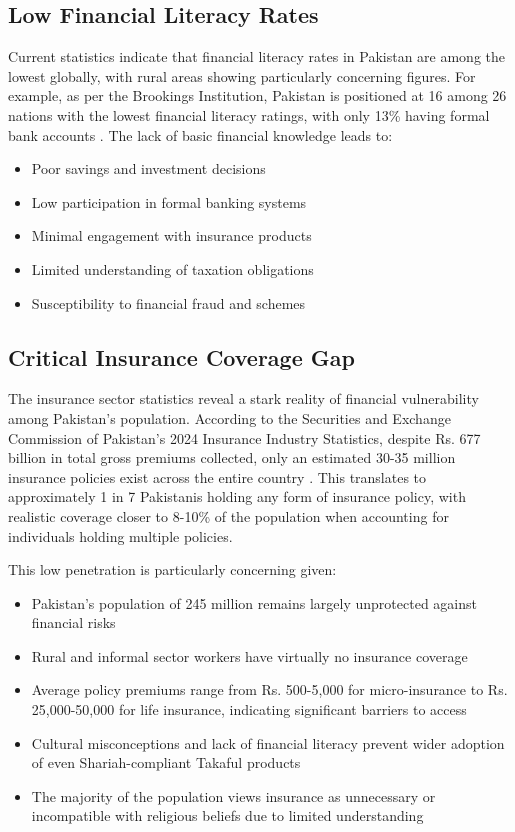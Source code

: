 \documentclass[12pt]{article}
\begin{document}
\subsection{Low Financial Literacy Rates}
Current statistics indicate that financial literacy rates in Pakistan are among the lowest globally, with rural areas showing particularly concerning figures. For example, as per the Brookings Institution, Pakistan is positioned at 16 among 26 nations with the lowest financial literacy ratings, with only 13\% having formal bank accounts \cite{brookings2024}. The lack of basic financial knowledge leads to:
\begin{itemize}
    \item Poor savings and investment decisions
    \item Low participation in formal banking systems
    \item Minimal engagement with insurance products
    \item Limited understanding of taxation obligations
    \item Susceptibility to financial fraud and schemes
\end{itemize}

\subsection{Critical Insurance Coverage Gap}
The insurance sector statistics reveal a stark reality of financial vulnerability among Pakistan's population. According to the Securities and Exchange Commission of Pakistan's 2024 Insurance Industry Statistics, despite Rs. 677 billion in total gross premiums collected, only an estimated 30-35 million insurance policies exist across the entire country \cite{secp2024}. This translates to approximately 1 in 7 Pakistanis holding any form of insurance policy, with realistic coverage closer to 8-10\% of the population when accounting for individuals holding multiple policies.

This low penetration is particularly concerning given:
\begin{itemize}
    \item Pakistan's population of 245 million remains largely unprotected against financial risks
    \item Rural and informal sector workers have virtually no insurance coverage
    \item Average policy premiums range from Rs. 500-5,000 for micro-insurance to Rs. 25,000-50,000 for life insurance, indicating significant barriers to access
    \item Cultural misconceptions and lack of financial literacy prevent wider adoption of even Shariah-compliant Takaful products
    \item The majority of the population views insurance as unnecessary or incompatible with religious beliefs due to limited understanding
\end{itemize}
\end{document}
